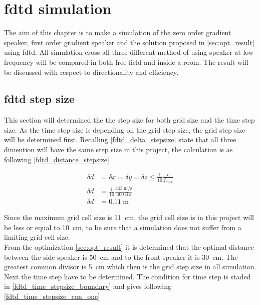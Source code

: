 \section{\gls{fdtd} simulation} \label{sec:fdtd_simulation}
The aim of this chapter is to make a simulation of the zero order gradient speaker, first order gradient speaker and the solution proposed in \autoref{sec:opt_result} using \gls{fdtd}. All simulation cross all three different method of using speaker at low frequency will be compared in both free field and inside a room. The result will be discussed with respect to directionality and efficiency. 

\subsection{\gls{fdtd} step size}
This section will determined the the step size for both grid size and the time step size. As the time step size is depending on the grid step size, the grid step size will be determined first. Recalling \autoref{fdtd_delta_stepsize} state that all three dimention will have the same step size in this project, the calculation is as following \autoref{fdtd_distance_stepsize} 

\begin{subequations}\label{fdtd_distance_stepsize}
\begin{alignat}{2}
\delta d &= \delta x = \delta y = \delta z \leq \frac{1}{10} \frac{c}{f_{max}} \label{fdtd_distance_stepsize_1}\\
\delta d &= \frac{1}{10} \frac{\SI{343}{\meter\per\second}}{\SI{300}{\hertz}} \label{fdtd_distance_stepsize_2}\\
\delta d &= \SI{0.11}{\meter} \label{fdtd_distance_stepsize_3}
\end{alignat}
\end{subequations}

    \startexplain
    \stopexplain

Since the maximum grid cell size is \SI{11}{\centi\meter}, the grid cell size is in this project will be less or equal to \SI{10}{\centi\meter}, to be sure that a simulation does not suffer from a limiting grid cell size. \\

From the optimization \autoref{sec:opt_result} it is determined that the optimal distance between the side speaker is \SI{50}{\centi\meter} and to the front speaker it is \SI{30}{\centi\meter}. The greatest common divisor is \SI{5}{\centi\meter} which then is the grid step size in all simulation. Next the time step have to be determined. The condition for time step is staded in \autoref{fdtd_time_stepsize_boundary} and gives following \autoref{fdtd_time_stepsize_con_one}
    
